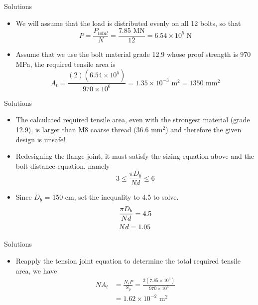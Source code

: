 \documentclass[10pt, svgnames]{beamer}
\begin{document}
\begin{frame}[label={sec:orgf865377}]{Solutions}
\begin{itemize}
  \item We will assume that the load is distributed evenly on all 12 bolts, so that
        \[P = \frac{{{P_{total}}}}{N} = \frac{7.85 \text{ MN}}{12} = 6.54 \times {10^5}\;{\text{N}}\]
  \item Assume that we use the bolt material grade 12.9 whose proof strength is 970 MPa, the required tensile area is
        \[{A_t} = \frac{(2)(6.54 \times 10^5)}{970 \times 10^6} = 1.35 \times 10^{ - 3} \text{ m}^2 = 1350 \text{ mm}^{2}\]
\end{itemize}
\end{frame}

\begin{frame}[label={sec:org9336530}]{Solutions}
\begin{itemize}
  \item The calculated required tensile area, even with the strongest material (grade 12.9), is larger than M8 coarse thread (36.6 mm$^2$) and therefore the given design is unsafe!
  \item Redesigning the flange joint, it must satisfy the sizing equation above and the bolt distance equation, namely
        \[3 \leqslant \frac{\pi D_b}{Nd} \leqslant 6\]
  \item Since $D_{b}$ = 150 cm, set the inequality to 4.5 to solve.
      \begin{gather*}
        \frac{{\pi {D_b}}}{{Nd}} = 4.5 \hfill \\
        Nd = 1.05 \hfill \\
      \end{gather*}
\end{itemize}
\end{frame}

\begin{frame}[label={sec:org29893f4}]{Solutions}
\begin{itemize}
  \item Reapply the tension joint equation to determine the total required tensile area, we have
        \begin{align*}
          N{A_t} &= \frac{{{N_s}P}}{{{S_p}}} = \frac{2(7.85 \times 10^6)}{970 \times 10^6} \\
                 &= 1.62 \times 10^{ - 2} \text{ m}^2
        \end{align*}
\end{itemize}
\end{frame}
\end{document}
